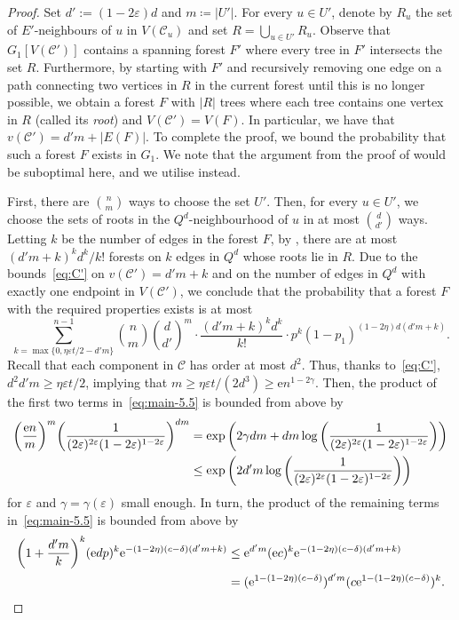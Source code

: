 \documentclass[reqno,final,a4paper]{amsart}
\theoremstyle{definition}
\newcommand{\cC}{\mathcal{C}}
\def\e{\mathrm{e}}
\def\eps{\varepsilon}
\newcommand{\1}{\mathbbm{1}}
\begin{document}
\begin{proof}
Set $d':=(1-2\eps)d$ and $m\coloneqq |U'|$. For every $u\in U'$, denote by $R_u$ the set of $E'$-neighbours of $u$ in $V(\cC_u)$ and set $R=\bigcup_{u\in U'}R_u$. 
Observe that $G_1[V(\cC')]$ contains a spanning forest $F'$ where every tree in $F'$ intersects the set $R$.
Furthermore, by starting with $F'$ and recursively removing one edge on a path connecting two vertices in $R$ in the current forest until this is no longer possible, we obtain a forest $F$ with $|R|$ trees where each tree contains one vertex in $R$ (called its \emph{root}) and $V(\cC')=V(F)$. In particular, we have that $v(\cC')=d'm+|E(F)|$.
To complete the proof, we bound the probability that such a forest $F$ exists in $G_1$. We note that the argument from the proof of  would be suboptimal here, and we utilise  instead. 

First, there are $\binom{n}{m}$ ways to choose the set $U'$. 
Then, for every $u\in U'$, we choose the sets of roots in the $Q^d$-neighbourhood of $u$ in at most $\binom{d}{d'}$ ways. Letting $k$ be the number of edges in the forest $F$, by , there are at most $(d'm+k)^kd^k/k!$ forests on $k$ edges in $Q^d$ whose roots lie in $R$. 
Due to the bounds~\eqref{eq:C'} on $v(\cC')=d'm+k$ and on the number of edges in $Q^d$ with exactly one endpoint in $V(\mathcal{C}')$, we conclude that the probability that a forest $F$ with the required properties exists is at most
\begin{equation}\label{eq:main-5.5}
\sum_{k=\max\{0,\eta \eps t/2-d'm\}}^{n-1} \binom{n}{m}\binom{d}{d'}^m\cdot \frac{(d'm+k)^kd^k}{k!}\cdot p^k (1-p_1)^{(1-2\eta)d(d'm+k)}.
\end{equation}
Recall that each component in $\cC$ has order at most $d^2$. Thus, thanks to~\eqref{eq:C'}, $d^2d'm\geq \eta\varepsilon t/2$, implying that $m\geq \eta \eps t/(2d^3)\ge \e n^{1-2\gamma}$.
Then, the product of the first two terms in~\eqref{eq:main-5.5} is bounded from above by 
\begin{align}
\bigg(\frac{\e n}{m}\bigg)^m \bigg(\frac{1}{(2\eps)^{2\eps}(1-2\eps)^{1-2\eps}}\bigg)^{dm}&=
\exp\left(2\gamma dm+dm\log\bigg(\frac{1}{(2\eps)^{2\eps}(1-2\eps)^{1-2\eps}}\bigg)\right)\notag \nonumber\\
&\leq 
\exp\left(2d'm\log\bigg(\frac{1}{(2\eps)^{2\eps}(1-2\eps)^{1-2\eps}}\bigg)\right)
\label{eq:1-2 terms}
\end{align}
for $\eps$ and $\gamma=\gamma(\eps)$ small enough. In turn, the product of the remaining terms in~\eqref{eq:main-5.5} is bounded from above by
\begin{align}
\label{eq:L5.4-auxiliary-bound}
\bigg(1+\frac{d'm}{k}\bigg)^k (\e dp)^k \e^{-(1-2\eta)(c-\delta)(d'm+k)}&\le \e^{d'm} (\e c)^k \e^{-(1-2\eta)(c-\delta)(d'm+k)}\notag\\&=(\e^{1-(1-2\eta)(c-\delta)})^{d'm}(c \e^{1-(1-2\eta)(c-\delta)})^k.
\end{align}


\end{proof}
\end{document}
